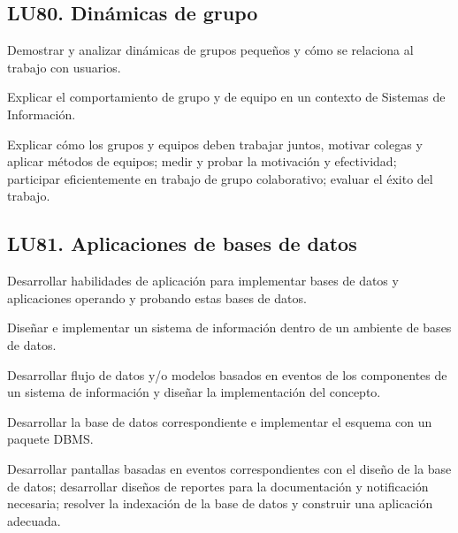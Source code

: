 \subsection{LU80. Dinámicas de grupo}\label{sec:LU80}
\begin{LearningUnit}
\begin{LUGoal}
\item Demostrar y analizar dinámicas de grupos pequeños y cómo se relaciona al trabajo con usuarios.
\end{LUGoal}

\begin{LUObjective}
\item Explicar el comportamiento de grupo y de equipo en un contexto de Sistemas de Información.
\item Explicar cómo los grupos y equipos deben trabajar juntos, motivar colegas y aplicar métodos de equipos; medir y probar la motivación y efectividad; participar eficientemente en trabajo de grupo colaborativo; evaluar el éxito del trabajo.
\end{LUObjective}
\end{LearningUnit}

\subsection{LU81. Aplicaciones de bases de datos}\label{sec:LU81}
\begin{LearningUnit}
\begin{LUGoal}
\item Desarrollar habilidades de aplicación para implementar bases de datos y aplicaciones operando y probando estas bases de datos.
\end{LUGoal}

\begin{LUObjective}
\item Diseñar e implementar un sistema de información dentro de un ambiente de bases de datos.
\item Desarrollar flujo de datos y/o modelos basados en eventos de los componentes de un sistema de información y diseñar la implementación del concepto.
\item Desarrollar la base de datos correspondiente e implementar el esquema con un paquete DBMS.
\item Desarrollar pantallas basadas en eventos correspondientes con el diseño de la base de datos; desarrollar diseños de reportes para la documentación y notificación necesaria; resolver la indexación de la base de datos y construir una aplicación adecuada.
\end{LUObjective}
\end{LearningUnit}

